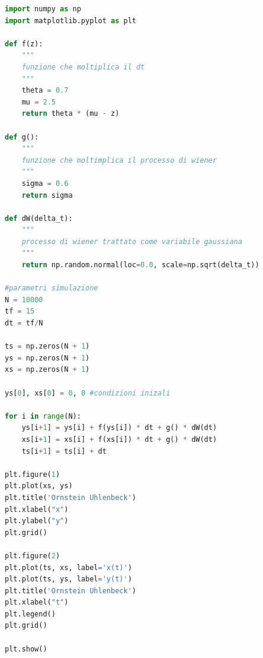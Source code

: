 \documentclass[10pt,a4paper]{article}
\begin{document}
\begin{lstlisting}[language=Python]
import numpy as np
import matplotlib.pyplot as plt

def f(z):
    """
    funzione che moltiplica il dt
    """
    theta = 0.7
    mu = 2.5
    return theta * (mu - z)

def g():
    """
    funzione che moltimplica il processo di wiener
    """
    sigma = 0.6
    return sigma

def dW(delta_t):
    """
    processo di wiener trattato come variabile gaussiana
    """
    return np.random.normal(loc=0.0, scale=np.sqrt(delta_t))

#parametri simulazione
N = 10000
tf = 15
dt = tf/N

ts = np.zeros(N + 1)
ys = np.zeros(N + 1)
xs = np.zeros(N + 1)

ys[0], xs[0] = 0, 0 #condizioni inizali

for i in range(N):
    ys[i+1] = ys[i] + f(ys[i]) * dt + g() * dW(dt)
    xs[i+1] = xs[i] + f(xs[i]) * dt + g() * dW(dt)
    ts[i+1] = ts[i] + dt

plt.figure(1)
plt.plot(xs, ys)
plt.title('Ornstein Uhlenbeck')
plt.xlabel("x")
plt.ylabel("y")
plt.grid()

plt.figure(2)
plt.plot(ts, xs, label='x(t)')
plt.plot(ts, ys, label='y(t)')
plt.title('Ornstein Uhlenbeck')
plt.xlabel("t")
plt.legend()
plt.grid()

plt.show()
\end{lstlisting}
\end{document}
